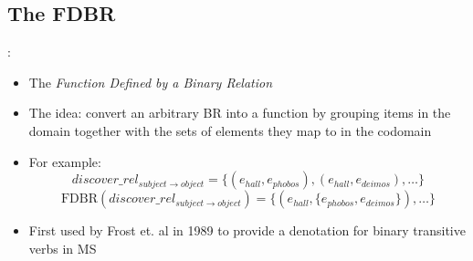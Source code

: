 \documentclass[logoontitle,tabu,supertabular,aspectratio=43]{preney-uwindsor-beamer}
\newcommand{\entityassoc}[1]{e_{#1}}
\newcommand{\FDBR}[1]{\mathrm{FDBR}({#1})}
\newcommand{\relationn}[3]{\mathit{#1\_rel_{#2 \rightarrow #3}}}
\begin{document}
    \subsection{The FDBR}
    \begin{frame}{\insertsection: \insertsubsection}
        \begin{itemize}
            \item The {\em Function Defined by a Binary Relation}
            \item The idea: convert an arbitrary BR into a function by grouping items in the domain together with the sets of elements they map to in the codomain
            \item For example:
            \begin{equation*}
                \relationn{discover}{subject}{object} = \{(\entityassoc{hall}, \entityassoc{phobos}),(\entityassoc{hall},\entityassoc{deimos}),\ldots\}
            \end{equation*}
            \begin{equation*}
                \FDBR{\relationn{discover}{subject}{object}} = \big\{(\entityassoc{hall}, \{\entityassoc{phobos}, \entityassoc{deimos}\}), \ldots\big\}
            \end{equation*}
            \item First used by Frost et. al in 1989 \cite{frost1989constructing} to provide a denotation for binary transitive verbs in MS
        \end{itemize}
    \end{frame}


\end{document}
